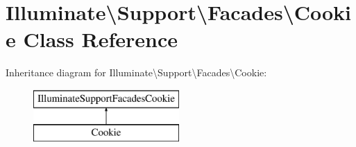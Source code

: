 \hypertarget{class_illuminate_1_1_support_1_1_facades_1_1_cookie}{}\section{Illuminate\textbackslash{}Support\textbackslash{}Facades\textbackslash{}Cookie Class Reference}
\label{class_illuminate_1_1_support_1_1_facades_1_1_cookie}
Inheritance diagram for Illuminate\textbackslash{}Support\textbackslash{}Facades\textbackslash{}Cookie\+:\begin{figure}[H]
\begin{center}
\leavevmode
\includegraphics[height=2.000000cm]{class_illuminate_1_1_support_1_1_facades_1_1_cookie}
\end{center}
\end{figure}
